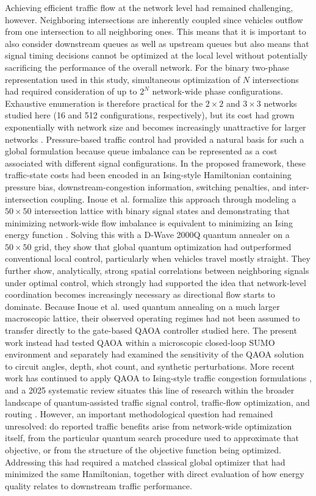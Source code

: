 Achieving efficient traffic flow at the network level had remained challenging, however. Neighboring intersections are inherently coupled since vehicles outflow from one intersection to all neighboring ones. This means that it is important to also consider downstream queues as well as upstream queues but also means that signal timing decisions cannot be optimized at the local level without potentially sacrificing the performance of the overall network. For the binary two-phase representation used in this study, simultaneous
optimization of $N$ intersections had required consideration of up to $2^N$
network-wide phase configurations. Exhaustive enumeration is therefore practical
for the $2\times2$ and $3\times3$ networks studied here (16 and 512
configurations, respectively), but its cost had grown exponentially with network
size and becomes increasingly unattractive for larger networks \cite{garey1979}. Pressure-based traffic control had provided a natural basis for such a global
formulation because queue imbalance can be represented as a cost associated with
different signal configurations. In the proposed framework, these traffic-state
costs had been encoded in an Ising-style Hamiltonian containing pressure bias,
downstream-congestion information, switching penalties, and
inter-intersection coupling. Inoue et al. formalize this approach through modeling a $50 \times 50$ intersection lattice with binary signal states and demonstrating that minimizing network-wide flow imbalance is equivalent to minimizing an Ising energy function \cite{inoue2021}. Solving this with a D-Wave 2000Q quantum annealer on a $50 \times 50$ grid, they show that global quantum optimization had outperformed conventional local control, particularly when vehicles travel mostly straight. They further show, analytically, strong spatial correlations between neighboring signals under optimal control, which strongly had supported the idea that network-level coordination becomes increasingly necessary as directional flow starts to dominate. Because Inoue et al. used quantum annealing on a much larger macroscopic
lattice, their observed operating regimes had not been assumed to transfer directly
to the gate-based QAOA controller studied here. The present work instead had tested
QAOA within a microscopic closed-loop SUMO environment and separately had examined
the sensitivity of the QAOA solution to circuit angles, depth, shot count, and
synthetic perturbations. More recent work has continued to apply QAOA to Ising-style traffic congestion
formulations \cite{villanueva2025}, and a 2025 systematic review situates this
line of research within the broader landscape of quantum-assisted traffic
signal control, traffic-flow optimization, and routing \cite{mohammed2025}.
However, an important methodological question had remained unresolved: do
reported traffic benefits arise from network-wide optimization itself, from the
particular quantum search procedure used to approximate that objective, or from
the structure of the objective function being optimized. Addressing this
had required a matched classical global optimizer that had minimized the same
Hamiltonian, together with direct evaluation of how energy quality relates to
downstream traffic performance.


